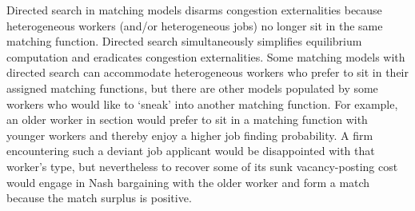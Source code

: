 Directed search in matching models disarms 
congestion externalities because heterogeneous workers (and/or
heterogeneous jobs) no longer sit in the same matching
function. Directed search simultaneously simplifies  equilibrium computation and eradicates congestion 
externalities.
Some matching models with directed search can accommodate 
heterogeneous workers who prefer to sit in their assigned 
matching functions, but there are other  models populated by some  workers
who would like  to `sneak' into another matching
function. For example, an older worker in section  would  prefer
to sit in a matching function with younger workers and thereby enjoy a higher
job finding probability. A firm encountering such a deviant
job applicant would be disappointed with that worker's type, but nevertheless  to recover some of  its sunk vacancy-posting cost   would  engage in Nash bargaining with the older worker and
form a match because the match surplus is positive. 


